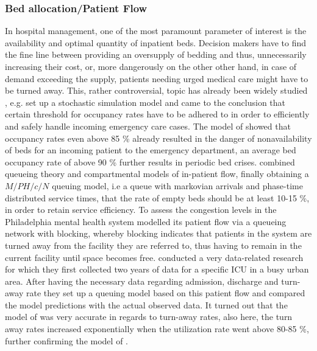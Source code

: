 \documentclass[11pt,a4paper]{article}
\begin{document}
\begin{spacing}{1.8}
\subsubsection{Bed allocation/Patient Flow}
In hospital management, one of the most paramount parameter of interest is the availability and optimal quantity of inpatient beds. Decision makers have to find the fine line between providing an oversupply of bedding and thus, unnecessarily increasing their cost, or, more dangerously on the other other hand, in case of  demand exceeding the supply, patients needing urged medical care might have to be turned away. 
This, rather controversial, topic has already been widely studied , e.g. 
\citet{Bagust1999} set up a stochastic simulation model and came to the conclusion that certain  threshold for occupancy rates have to be adhered to in order to efficiently and safely handle incoming emergency care cases. The model of \citep{Bagust1999} showed that occupancy rates even above 85 \%  already resulted in the danger of nonavailability of beds for an incoming patient to the emergency department, an average bed occupancy rate of above 90 \% further results in periodic bed crises. %
\citep{Gorunescu2002} combined queueing theory and compartmental models of in-patient flow, finally obtaining a \(M/PH/c/N\) queuing model, i.e a queue with markovian arrivals and phase-time distributed service times, that the rate of empty beds should be at least 10-15 \%, in order to retain service efficiency. 
To assess the congestion levels in the Philadelphia mental health system \citet{Koizumi2005} modelled its patient flow via a queueing network with blocking, whereby blocking indicates that patients in the system are turned away from the facility they are referred to, thus having to remain in the current facility until space becomes free. 
\citet{McManus2004} conducted a very data-related research for which they first collected two years of data for a specific ICU in a busy urban area. After having the necessary data regarding admission, discharge and turn-away rate  they set up a queuing model based on this patient flow and compared the model predictions with the actual observed data. It turned out that the model of \citep{McManus2004} was very accurate in regards to turn-away rates, also here, the turn away rates increased exponentially when the utilization rate went above 80-85 \%, further confirming the model of \citet{Bagust1999}.

\end{spacing}
\end{document}
